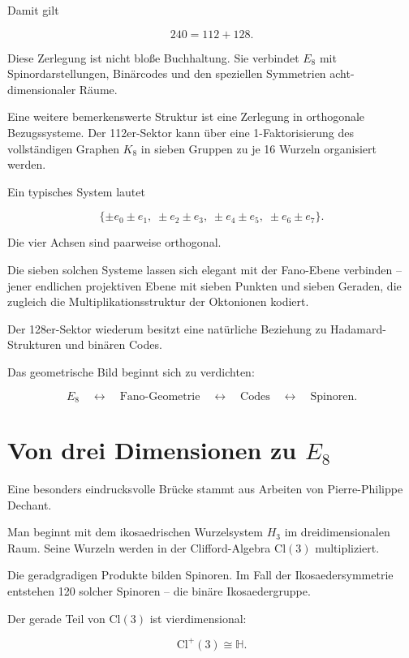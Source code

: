 \documentclass[11pt,a4paper]{article}
\begin{document}
Damit gilt


\[
240=112+128.
\]


Diese Zerlegung ist nicht bloße Buchhaltung. Sie verbindet \(E_8\) mit Spinordarstellungen, Binärcodes und den speziellen Symmetrien acht-dimensionaler Räume.


Eine weitere bemerkenswerte Struktur ist eine Zerlegung in orthogonale Bezugssysteme. Der 112er-Sektor kann über eine 1-Faktorisierung des vollständigen Graphen \(K_8\) in sieben Gruppen zu je 16 Wurzeln organisiert werden.


Ein typisches System lautet


\[
\{\pm e_0\pm e_1,\;
\pm e_2\pm e_3,\;
\pm e_4\pm e_5,\;
\pm e_6\pm e_7\}.
\]


Die vier Achsen sind paarweise orthogonal.


Die sieben solchen Systeme lassen sich elegant mit der Fano-Ebene verbinden – jener endlichen projektiven Ebene mit sieben Punkten und sieben Geraden, die zugleich die Multiplikationsstruktur der Oktonionen kodiert.


Der 128er-Sektor wiederum besitzt eine natürliche Beziehung zu Hadamard-Strukturen und binären Codes.


Das geometrische Bild beginnt sich zu verdichten:


\[
E_8
\quad\leftrightarrow\quad
\text{Fano-Geometrie}
\quad\leftrightarrow\quad
\text{Codes}
\quad\leftrightarrow\quad
\text{Spinoren}.
\]





\section{\texorpdfstring{Von drei Dimensionen zu \(E_8\)}{Von drei Dimensionen zu E8}}


Eine besonders eindrucksvolle Brücke stammt aus Arbeiten von Pierre-Philippe Dechant.


Man beginnt mit dem ikosaedrischen Wurzelsystem \(H_3\) im dreidimensionalen Raum. Seine Wurzeln werden in der Clifford-Algebra \(\mathrm{Cl}(3)\) multipliziert.


Die geradgradigen Produkte bilden Spinoren. Im Fall der Ikosaedersymmetrie entstehen 120 solcher Spinoren – die binäre Ikosaedergruppe.


Der gerade Teil von \(\mathrm{Cl}(3)\) ist vierdimensional:


\[
\mathrm{Cl}^{+}(3)\cong\mathbb H.
\]
\end{document}
